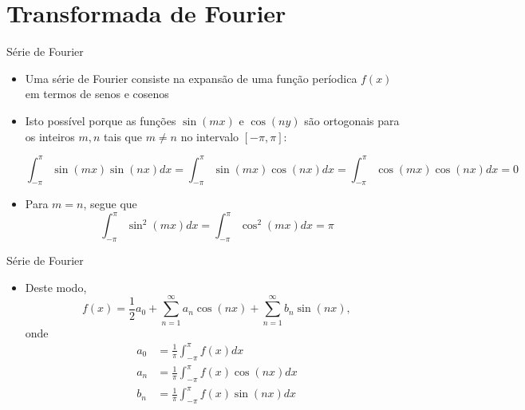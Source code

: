 \section{Transformada de Fourier}

\begin{frame}[fragile]{Série de Fourier}

    \begin{itemize}
        \item Uma série de Fourier consiste na expansão de uma função períodica $f(x)$ em termos
            de senos e cosenos

        \item Isto possível porque as funções $\sin(mx)$ e $\cos(ny)$ são ortogonais para 
            os inteiros $m, n$ tais que $m\neq n$ no intervalo $[-\pi, \pi]$:

        \[
            \int_{-\pi}^\pi \sin(mx)\sin(nx) dx = 
            \int_{-\pi}^\pi \sin(mx)\cos(nx) dx = \int_{-\pi}^\pi \cos(mx)\cos(nx) dx = 0
        \]

        \item Para $m = n$, segue que
        \[
            \int_{-\pi}^\pi \sin^2(mx) dx = 
            \int_{-\pi}^\pi \cos^2(mx) dx = \pi
        \]

    \end{itemize}

\end{frame}

\begin{frame}[fragile]{Série de Fourier}

    \begin{itemize}
        \item Deste modo,
        \[
            f(x) = \frac{1}{2}a_0 + \sum_{n=1}^\infty a_n\cos(n x) + \sum_{n=1}^\infty b_n\sin(nx),
        \]
        onde
        \begin{align*}
            a_0 &= \frac{1}{\pi}\int_{-\pi}^{\pi} f(x)dx \\    
            a_n &= \frac{1}{\pi}\int_{-\pi}^{\pi} f(x)\cos(nx)dx \\    
            b_n &= \frac{1}{\pi}\int_{-\pi}^{\pi} f(x)\sin(nx)dx    
        \end{align*}
    
    \end{itemize}

\end{frame}

